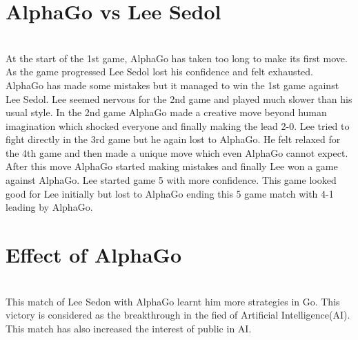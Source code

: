 \documentclass{article}
\begin{document}
\section{AlphaGo vs Lee Sedol}
\begin{paragraph}
\\
At the start of the 1st game, AlphaGo has taken too long to make its first move. As the game progressed Lee Sedol lost his confidence and felt exhausted. AlphaGo has made some mistakes but it managed to win the 1st game against Lee Sedol. Lee seemed nervous for the 2nd game and played much slower than his usual style. In the 2nd game AlphaGo made a creative move beyond human imagination which shocked everyone and finally making the lead 2-0. Lee tried to fight directly in the 3rd game but he again lost to AlphaGo. He felt relaxed for the 4th game and then made a unique move which even AlphaGo cannot expect. After this move AlphaGo started making mistakes and finally Lee won a game against AlphaGo. Lee started game 5 with more confidence. This game looked good for Lee initially but lost to AlphaGo ending this 5 game match with 4-1 leading by AlphaGo.
\end{paragraph}
\section{Effect of AlphaGo}
\begin{paragraph}
\\
This match of Lee Sedon with AlphaGo learnt him more strategies in Go. This victory is considered as the breakthrough in the fied of Artificial Intelligence(AI). This match has also increased the interest of public in AI.
\end{paragraph}
\end{document}
